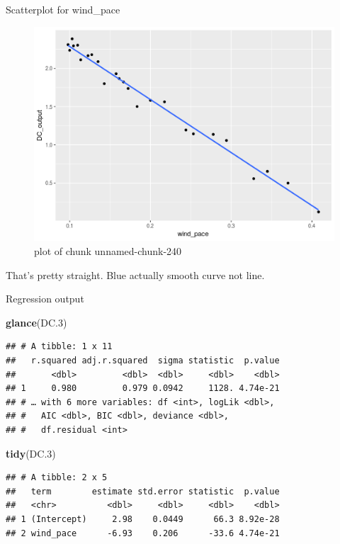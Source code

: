 \documentclass[ignorenonframetext,]{beamer}
\newenvironment{Shaded}{\begin{snugshade}}{\end{snugshade}}
\newcommand{\FloatTok}[1]{\textcolor[rgb]{0.00,0.00,0.81}{#1}}
\newcommand{\KeywordTok}[1]{\textcolor[rgb]{0.13,0.29,0.53}{\textbf{#1}}}
\newcommand{\NormalTok}[1]{#1}
\begin{document}
\begin{frame}{Scatterplot for wind\_pace}
\protect\hypertarget{scatterplot-for-wind_pace}{}

\begin{figure}
\centering
\includegraphics{figure/unnamed-chunk-240-1.png}
\caption{plot of chunk unnamed-chunk-240}
\end{figure}

That's pretty straight. Blue actually smooth curve not line.

\end{frame}

\begin{frame}[fragile]{Regression output}
\protect\hypertarget{regression-output}{}

\begin{Shaded}
\begin{Highlighting}[]
\KeywordTok{glance}\NormalTok{(DC}\FloatTok{.3}\NormalTok{)}
\end{Highlighting}
\end{Shaded}

\begin{verbatim}
## # A tibble: 1 x 11
##   r.squared adj.r.squared  sigma statistic  p.value
##       <dbl>         <dbl>  <dbl>     <dbl>    <dbl>
## 1     0.980         0.979 0.0942     1128. 4.74e-21
## # … with 6 more variables: df <int>, logLik <dbl>,
## #   AIC <dbl>, BIC <dbl>, deviance <dbl>,
## #   df.residual <int>
\end{verbatim}

\begin{Shaded}
\begin{Highlighting}[]
\KeywordTok{tidy}\NormalTok{(DC}\FloatTok{.3}\NormalTok{)}
\end{Highlighting}
\end{Shaded}

\begin{verbatim}
## # A tibble: 2 x 5
##   term        estimate std.error statistic  p.value
##   <chr>          <dbl>     <dbl>     <dbl>    <dbl>
## 1 (Intercept)     2.98    0.0449      66.3 8.92e-28
## 2 wind_pace      -6.93    0.206      -33.6 4.74e-21
\end{verbatim}

\end{frame}
\end{document}
